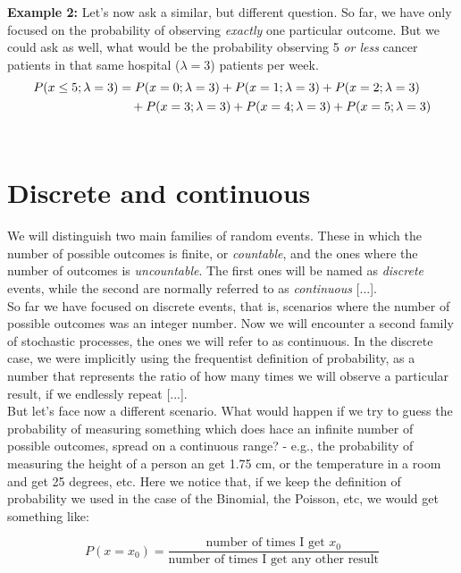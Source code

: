 \documentclass{book}
\begin{document}
\textbf{Example 2:} Let's now ask a similar, but different question. So far, we have only focused on the probability of observing \textit{exactly} one particular outcome. But we could ask as well, what would be the probability observing 5 \textit{or less} cancer patients in that same hospital ($\lambda = 3$) patients per week.
\begin{align}
    P(x \leq 5; \lambda = 3) &= P(x=0; \lambda = 3) + P(x=1; \lambda = 3) + P(x=2; \lambda = 3) \notag \\
    &\quad + P(x=3; \lambda = 3) + P(x=4; \lambda = 3) + P(x=5; \lambda = 3) \notag
\end{align}\\

\newpage

\section{Discrete and continuous}

We will distinguish two main families of random events. These in which the number of possible outcomes is finite, or \textit{countable}, and the ones where the number of outcomes is \textit{uncountable}. The first ones will be named as \textit{discrete} events, while the second are normally referred to as \textit{continuous} [...]. \\

So far we have focused on discrete events, that is, scenarios where the number of possible outcomes was an integer number. Now we will encounter a second family of stochastic processes, the ones we will refer to as continuous. In the discrete case, we were implicitly using the frequentist definition of probability, as a number that represents the ratio of how many times we will observe a particular result, if we endlessly repeat [...].\\

But let's face now a different scenario. What would happen if we try to guess the probability of measuring something which does hace an infinite number of possible outcomes, spread on a continuous range? - e.g., the probability of measuring the height of a person an get 1.75 cm, or the temperature in a room and get 25 degrees, etc. Here we notice that, if we keep the definition of probability we used in the case of the Binomial, the Poisson, etc, we would get something like:

\begin{equation}
P(x = x_{0}) = \frac{\text{number of times I get $x_{0}$}}{\text{number of times I get any other result}}
\end{equation}
\end{document}

